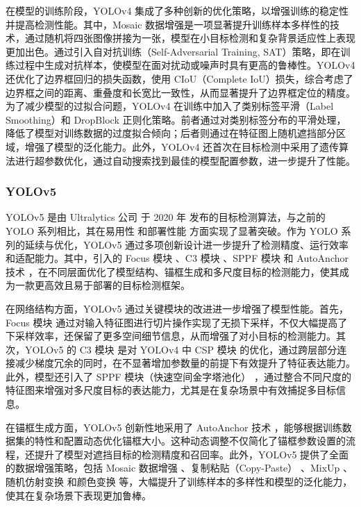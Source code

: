 \documentclass[11pt,twocolumn]{ctexart}
\begin{document}
在模型的训练阶段，YOLOv4 集成了多种创新的优化策略，以增强训练的稳定性并提高检测性能。其中，Mosaic 数据增强是一项显著提升训练样本多样性的技术，通过随机将四张图像拼接为一张，模型在小目标检测和复杂背景适应性上表现更加出色。通过引入自对抗训练（Self-Adversarial Training, SAT）策略，即在训练过程中生成对抗样本，使模型在面对扰动或噪声时具有更高的鲁棒性。YOLOv4 还优化了边界框回归的损失函数，使用 CIoU（Complete IoU）损失，综合考虑了边界框之间的距离、重叠度和长宽比一致性，从而显著提升了边界框定位的精度。为了减少模型的过拟合问题，YOLOv4 在训练中加入了类别标签平滑（Label Smoothing）和 DropBlock 正则化策略。前者通过对类别标签分布的平滑处理，降低了模型对训练数据的过度拟合倾向；后者则通过在特征图上随机遮挡部分区域，增强了模型的泛化能力。此外，YOLOv4 还首次在目标检测中采用了遗传算法进行超参数优化，通过自动搜索找到最佳的模型配置参数，进一步提升了性能。

\subsubsection{YOLOv5}
YOLOv5\cite{yolov5} 是由 Ultralytics 公司 于 2020 年 发布的目标检测算法，与之前的 YOLO 系列相比，其在易用性 和部署性能 方面实现了显著突破。作为 YOLO 系列的延续与优化，YOLOv5 通过多项创新设计进一步提升了检测精度、运行效率和适配能力。其中，引入的 Focus 模块 、C3 模块 、SPPF 模块 和 AutoAnchor 技术 ，在不同层面优化了模型结构、锚框生成和多尺度目标的检测能力，使其成为一款更高效且易于部署的目标检测框架。

在网络结构方面，YOLOv5 通过关键模块的改进进一步增强了模型性能。首先，Focus 模块 通过对输入特征图进行切片操作实现了无损下采样，不仅大幅提高了下采样效率，还保留了更多空间细节信息，从而增强了对小目标的检测能力。其次，YOLOv5 的 C3 模块 是对 YOLOv4 中 CSP 模块 的优化，通过跨层部分连接减少梯度冗余的同时，在不显著增加参数量的前提下有效提升了特征表达能力。此外，模型还引入了 SPPF 模块（快速空间金字塔池化） ，通过整合不同尺度的特征图来增强对多尺度目标的表达能力，尤其是在复杂场景中有效捕捉多目标信息。

在锚框生成方面，YOLOv5 创新性地采用了 AutoAnchor 技术 ，能够根据训练数据集的特性和配置动态优化锚框大小。这种动态调整不仅简化了锚框参数设置的流程，还提升了模型对遮挡目标的检测精度和召回率。此外，YOLOv5 提供了全面的数据增强策略，包括 Mosaic 数据增强 、复制粘贴（Copy-Paste） 、MixUp 、随机仿射变换 和颜色变换 等，大幅提升了训练样本的多样性和模型的泛化能力，使其在复杂场景下表现更加鲁棒。
\end{document}
